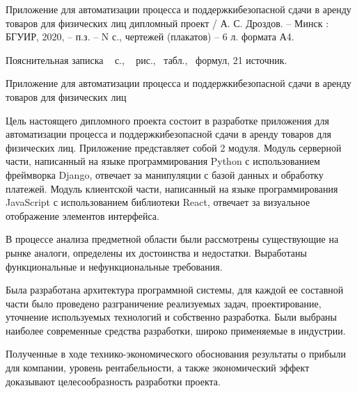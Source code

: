 \thispagestyle{empty}

Приложение для автоматизации процесса и поддержкибезопасной сдачи в аренду товаров для физических лиц дипломный проект / А. С. Дроздов. – Минск : БГУИР, 2020, – п.з. – N с., чертежей (плакатов) – 6 л. формата А4.

Пояснительная записка ~\pageref*{LastPage} с., \totfig{}~ рис., \tottab{}~табл., \toteq{}~формул, 21 источник.

Приложение для автоматизации процесса и поддержкибезопасной сдачи в аренду товаров для физических лиц

Цель настоящего дипломного проекта состоит в разработке приложения для автоматизации процесса и поддержкибезопасной сдачи в аренду товаров для физических лиц.
Приложение представляет собой 2 модуля.
Модуль серверной части, написанный на языке программирования Python с использованием фреймворка Django, отвечает за манипуляции с базой данных и обработку платежей.
Модуль клиентской части, написанный на языке программирования JavaScript с использованием библиотеки React, отвечает за визуальное отображение элементов интерфейса.

В процессе анализа предметной области были рассмотрены существующие на рынке аналоги, определены их достоинства и недостатки.
Выработаны функциональные и нефункциональные требования.

Была разработана архитектура программной системы, для каждой ее составной части было проведено разграничение реализуемых задач, проектирование, уточнение используемых технологий и собственно разработка.
Были выбраны наиболее современные средства разработки, широко применяемые в индустрии.

Полученные в ходе технико-экономического обоснования результаты о прибыли для компании, уровень рентабельности, а также экономический эффект доказывают целесообразность разработки проекта.
\pagebreak
